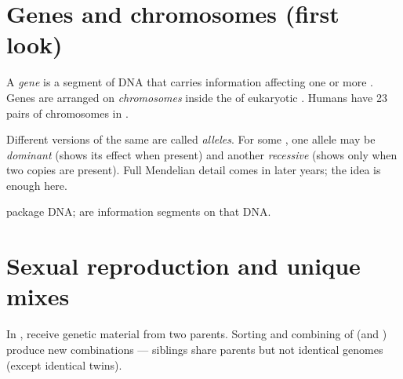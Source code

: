 \section{Genes and chromosomes (first look)}

\begin{definition}\label{def:g7:heredity:gene}
A \emph{gene} is a segment of DNA that carries information
affecting one or more . Genes are arranged on
\emph{chromosomes} inside the  of eukaryotic
. Humans have 23 pairs of chromosomes in  .
\end{definition}

\begin{definition}\label{def:g7:heredity:allele}
Different versions of the same  are called \emph{alleles}.
For some , one allele may be \emph{dominant}
(shows its effect when present) and another \emph{recessive} (shows only when two copies are present). Full Mendelian detail
comes in later years; the idea is enough here.
\end{definition}

\begin{omfigure}

{\small {} package DNA;  are information segments on that
DNA.}
\end{omfigure}

\section{Sexual reproduction and unique mixes}

\begin{proposition}\label{prop:g7:heredity:unique}
In ,  receive genetic material from two
parents. Sorting and combining of  (and ) produce new
combinations --- siblings share parents but not identical genomes
(except identical twins).
\end{proposition}
\admitted

